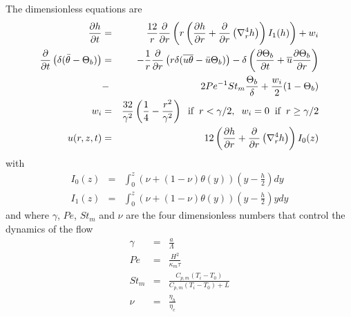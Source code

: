 The dimensionless equations are
\begin{eqnarray}
  \frac{\partial h}{\partial t}& =& \frac{12}{r}
                                    \frac{\partial}{\partial r} \left( r\left( \frac{\partial h}{\partial      r}+\frac{\partial}{\partial      r}\left(\nabla_r^4h\right)\right)I_1(h)\right)
                                    + w_i\label{C3-EqFinal1}\\
  \frac{\partial}{\partial
  t}\left( \delta( \bar{\theta}-\Theta_b)\right)&=&-\frac{1}{r}\frac{\partial}{\partial
                                                    r}  \left(   r\delta(\overline{u\theta}-\bar{u}\Theta_b)\right)  -
                                                    \delta\left(      \frac{\partial       \Theta_b}{\partial      t}+
                                                    \overline{u}\frac{\partial     \Theta_b}{\partial    r}\right)\nonumber\\
                               &-&
                                   2Pe^{-1}St_m\frac{\Theta_b}{\delta}+\frac{w_{i}}{2}(1-\Theta_b)\label{C3-HeatDimensionLess}\\
  w_{i}&=&
           \frac{32}{\gamma^{2}}\left(\frac{1}{4}-\frac{r^{2}}{\gamma^{2}}\right)\hspace{.2cm}
           \text{if} \hspace{.2cm} r < \gamma/2,\hspace{.2cm} w_i=0 \hspace{.2cm}
           \text{if} \hspace{.2cm} r \ge \gamma/2\\
  u(r,z,t)&   =&   12\left(   \frac{\partial   h}{\partial
                 r}+\frac{\partial}{\partial
                 r}\left(\nabla_r^4h\right)\right)I_0(z)\label{C3-Veloc}
\end{eqnarray}
with
\begin{eqnarray}
  I_0(z)&=&\int_0^z \left(\nu+(1-\nu)\theta(y)\right)\left(y-\frac{h}{2}\right)
            dy \label{C3-I_1}\\
  I_1(z) &=& \int_0^z \left(\nu+(1-\nu)\theta(y)\right)\left(y-\frac{h}{2}\right)y dy\label{C3-I_2}
\end{eqnarray}
and where $\gamma$, $Pe$, $St_m$  and $\nu$ are the four dimensionless
numbers that control the dynamics of the flow
\begin{eqnarray}
  \gamma&=&\frac{a}{\Lambda} \label{C3-gamma}\\
  Pe&=&            \frac{H^2}{\kappa_m            \tau}\label{C3-Pe}\\
  St_m &=& \frac{C_{p,m}\left(T_i-T_0\right)}{C_{p,m}\left(T_i-T_0\right)+L} \label{C3-St}\\
  \nu&=& \frac{\eta_h}{\eta_c}\label{C3-nu}
\end{eqnarray}

